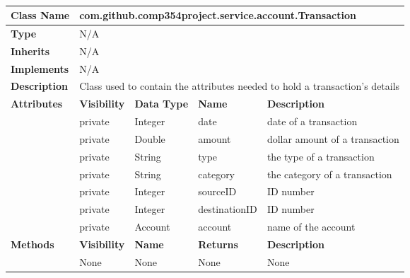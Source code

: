 \documentclass[12pt]{article}
\begin{document}
\begin{table}[H]
\centering
\caption{}
\label{my-label}
\begin{tabular}{|l|l|l|l|l|}
\hline
\textbf{Class Name}                  & \multicolumn{4}{l|}{com.github.comp354project.service.account.Transaction}                       \\ \hline
\textbf{Type}                        & \multicolumn{4}{l|}{N/A}                                                                         \\ \hline
\textbf{Inherits}                    & \multicolumn{4}{l|}{N/A}                                                                         \\ \hline
\textbf{Implements}                  & \multicolumn{4}{l|}{N/A}                                                                         \\ \hline
\textbf{Description}                 & \multicolumn{4}{l|}{Class used to contain the attributes needed to hold a transaction's details} \\ \hline
\multirow{8}{*}{\textbf{Attributes}} & \textbf{Visibility}  & \textbf{Data Type}  & \textbf{Name}     & \textbf{Description}            \\ \cline{2-5} 
                                     & private              & Integer             & date              & date of a transaction           \\ \cline{2-5} 
                                     & private              & Double              & amount            & dollar amount of a transaction  \\ \cline{2-5} 
                                     & private              & String              & type              & the type of a transaction       \\ \cline{2-5} 
                                     & private              & String              & category          & the category of a transaction   \\ \cline{2-5} 
                                     & private              & Integer             & sourceID          & ID number                       \\ \cline{2-5} 
                                     & private              & Integer             & destinationID     & ID number                       \\ \cline{2-5} 
                                     & private              & Account             & account           & name of the account             \\ \hline
\multirow{2}{*}{\textbf{Methods}}    & \textbf{Visibility}  & \textbf{Name}       & \textbf{Returns}  & \textbf{Description}            \\ \cline{2-5} 
                                     & None                 & None                & None              & None                            \\ \hline
\end{tabular}
\end{table}
\end{document}
